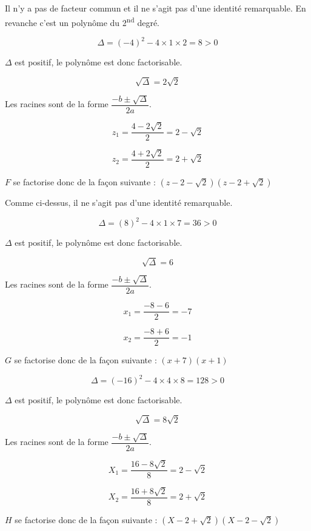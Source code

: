 \documentclass[a4paper,12pt]{scrartcl}
\begin{document}

Il n'y a pas de facteur commun et il ne s'agit pas d'une identité remarquable. En revanche c'est un polynôme du 2\textsuperscript{nd} degré. 

$$\Delta = (-4)^2 - 4 \times 1 \times 2 = 8 > 0$$

$\Delta$ est positif, le polynôme est donc factorisable.

$$\sqrt{\Delta} = 2 \sqrt{2}$$

Les racines sont de la forme $\dfrac{-b \pm \sqrt{\Delta}}{2a}$.

$$z_1 = \dfrac{4-2\sqrt{2}}{2} = 2-\sqrt{2}$$

$$z_2 = \dfrac{4+2\sqrt{2}}{2} = 2+\sqrt{2}$$

$F$ se factorise donc de la façon suivante : $(z - 2 - \sqrt{2})(z - 2 + \sqrt{2})$


Comme ci-dessus, il ne s'agit pas d'une identité remarquable.

$$\Delta = (8)^2 - 4 \times 1 \times 7 = 36 > 0$$

$\Delta$ est positif, le polynôme est donc factorisable.

$$\sqrt{\Delta} = 6$$

Les racines sont de la forme $\dfrac{-b \pm \sqrt{\Delta}}{2a}$.

$$x_1 = \dfrac{-8-6}{2} = -7$$

$$x_2 = \dfrac{-8+6}{2} = -1$$

$G$ se factorise donc de la façon suivante : $(x + 7)(x + 1)$


$$\Delta = (-16)^2 - 4 \times 4 \times 8 = 128 > 0$$

$\Delta$ est positif, le polynôme est donc factorisable.

$$\sqrt{\Delta} = 8\sqrt{2}$$

Les racines sont de la forme $\dfrac{-b \pm \sqrt{\Delta}}{2a}$.

$$X_1 = \dfrac{16-8\sqrt{2}}{8} = 2-\sqrt{2}$$

$$X_2 = \dfrac{16+8\sqrt{2}}{8} = 2+\sqrt{2}$$

$H$ se factorise donc de la façon suivante : $(X - 2 + \sqrt{2})(X - 2 - \sqrt{2})$


\end{document}
